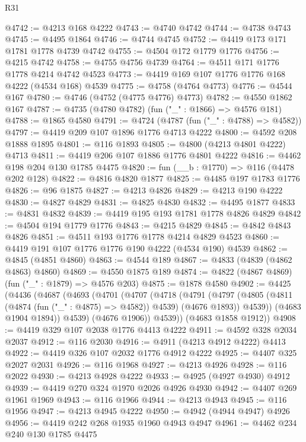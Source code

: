 \begin{lexlean}{R31}
\begin{coremodule}
@4742 := @4213 @168 @4222
@4743 := @4740 @4742
@4744 := @4738 @4743
@4745 := @4495 @1864
@4746 := @4744 @4745
@4752 := @4419 @173 @171 @1781 @1778 @4739 @4742
@4755 := @4504 @172 @1779 @1776
@4756 := @4215 @4742
@4758 := @4755 @4756 @4739
@4764 := @4511 @171 @1776 @1778 @4214 @4742 @4523
@4773 := @4419 @169 @107 @1776 @1776 @168 @4222 (@4534 @168) @4539
@4775 := @4758 (@4764 @4773)
@4776 := @4544 @167
@4780 := @4746 (@4752 (@4775 @4776) @4773)
@4782 := @4550 @1862 @167
@4787 := @4735 (@4780 @4782) (fun ("_" : @1866) => @4576 @181)
@4788 := @1865 @4580
@4791 := @4724 (@4787 (fun ("_" : @4788) => @4582))
@4797 := @4419 @209 @107 @1896 @1776 @4713 @4222
@4800 := @4592 @208 @1888 @1895
@4801 := @116 @1893
@4805 := @4800 (@4213 @4801 @4222) @4713
@4811 := @4419 @206 @107 @1886 @1776 @4801 @4222
@4816 := @4462 @198 @204 @130 @1785 @4475
@4820 := fun (__b : @1770) => @116 (@4478 @202 @128)
@4822 := @4816 @4820 @1877
@4825 := @4485 @197 @1783 @1776
@4826 := @96 @1875
@4827 := @4213 @4826
@4829 := @4213 @190 @4222
@4830 := @4827 @4829
@4831 := @4825 @4830
@4832 := @4495 @1877
@4833 := @4831 @4832
@4839 := @4419 @195 @193 @1781 @1778 @4826 @4829
@4842 := @4504 @194 @1779 @1776
@4843 := @4215 @4829
@4845 := @4842 @4843 @4826
@4851 := @4511 @193 @1776 @1778 @4214 @4829 @4523
@4860 := @4419 @191 @107 @1776 @1776 @190 @4222 (@4534 @190) @4539
@4862 := @4845 (@4851 @4860)
@4863 := @4544 @189
@4867 := @4833 (@4839 (@4862 @4863) @4860)
@4869 := @4550 @1875 @189
@4874 := @4822 (@4867 @4869) (fun ("_" : @1879) => @4576 @203)
@4875 := @1878 @4580
@4902 := @4425
    (@4436
      (@4687
        (@4693
          (@4701
            (@4707
              (@4718
                (@4791
                  (@4797
                    (@4805 (@4811 (@4874 (fun ("_" : @4875) => @4582)) @4539) (@4676 @1893))
                    @4539))
                (@4683 @1904 @1894))
              @4539)
            (@4676 @1906))
          @4539))
      (@4683 @1858 @1912))
@4908 := @4419 @329 @107 @2038 @1776 @4413 @4222
@4911 := @4592 @328 @2034 @2037
@4912 := @116 @2030
@4916 := @4911 (@4213 @4912 @4222) @4413
@4922 := @4419 @326 @107 @2032 @1776 @4912 @4222
@4925 := @4407 @325 @2027 @2031
@4926 := @116 @1968
@4927 := @4213 @4926
@4928 := @116 @2022
@4930 := @4213 @4928 @4222
@4933 := @4925 (@4927 @4930) @4912
@4939 := @4419 @270 @324 @1970 @2026 @4926 @4930
@4942 := @4407 @269 @1961 @1969
@4943 := @116 @1966
@4944 := @4213 @4943
@4945 := @116 @1956
@4947 := @4213 @4945 @4222
@4950 := @4942 (@4944 @4947) @4926
@4956 := @4419 @242 @268 @1935 @1960 @4943 @4947
@4961 := @4462 @234 @240 @130 @1785 @4475

\end{coremodule}
\end{lexlean}
